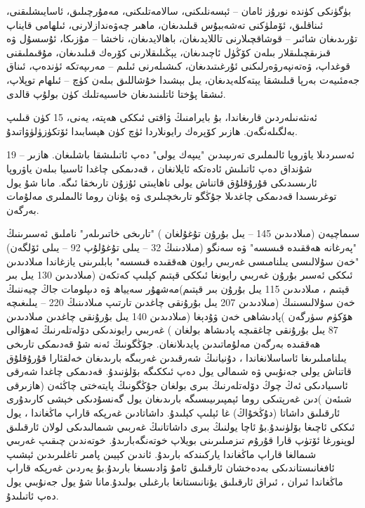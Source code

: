 \documentclass[a4paper]{article}
\begin{document}
\begin{flushright}
بۈگۈنكى كۈندە نورۇز ئامان – ئېسەنلىكنى، سالامەتلىكنى، مەمۇرچىلىق، ئاسايىشلىقنى، ئىناقلىق، ئۆملۈكنى تەشەببۇس قىلىدىغان، ماھىر چەۋەندازلارنى، ئىلھامى قايناپ تۇرىدىغان شائىر – قوشاقچىلارنى تاللايدىغان، باھالايدىغان، ناخشا – مۇزىكا، ئۇسسۇل ۋە قىزىقچىلىقلار بىلەن كۆڭۈل ئاچىدىغان، يېڭىلىقلارنى كۆرەك قىلىدىغان، مۇقىملىقنى قوغداپ، ۋەتەنپەرۋەرلىكنى ئۇرغىتىدىغان، كىشىلەرنى ئىلىم – مەرىپەتكە ئۈندەپ، ئىناق جەمئىيەت بەرپا قىلىشقا يېتەكلەيدىغان، يىل بېشىدا خۇشاللىق بىلەن كۈچ – ئىلھام توپلاپ، ئىشقا پۇختا ئاتلىنىدىغان خاسىيەتلىك كۈن بولۇپ قالدى.



ئەنئەنىلەردىن قارىغاندا، بۇ بايرامنىڭ ۋاقتى ئىككى ھەپتە، يەنى، 15 كۈن قىلىپ بەلگىلەنگەن. ھازىر كۆپرەك رايونلاردا ئۈچ كۈن ھېسابىدا ئۆتكۈزۈلۈۋاتىدۇ.

19 – ئەسىردىلا ياۋروپا ئالىملىرى تەرىپىدىن "يىپەك يولى" دەپ ئاتىلىشقا باشلىغان. ھازىر شۇنداق دەپ ئاتىلىش ئادەتكە ئايلانغان ، قەدىمكى چاغدا ئاسىيا بىلەن ياۋروپا ئارىسىدىكى قۇرۇقلۇق قاتناش يولى ناھايىتى ئۇزۇن تارىخقا ئىگە. مانا شۇ يول توغرىسىدا قەدىمكى چاغدىلا جۇڭگو تارىخچىلىرى ۋە يۇنان روما ئالىملىرى مەلۇمات بەرگەن.



سىماچيەن (مىلادىدىن 145 – يىل بۇرۇن تۇغۇلغان ) "تارىخى خاتىرىلەر" ناملىق ئەسىرىنىڭ "پەرغانە ھەققىدە قىسسە" ۋە سەنگو (مىلادىنىڭ 32 – يىلى تۇغۇلۇپ 92 – يىلى ئۆلگەن) "خەن سۇلالىسى يىلنامىسى غەربىي رايون ھەققىدە قىسسە" بابلىرىنى يازغاندا مىلادىدىن ئىككى ئەسىر بۇرۇن غەربىي رايونغا ئىككى قېتىم كېلىپ كەتكەن (مىلادىدىن 130 يىل بىر قېتىم ، مىلادىدىن 115 يىل بۇرۇن بىر قېتىم)مەشھۇر سەيياھ ۋە دىپلومات جاڭ چيەننىڭ خەن سۇلالىسىنىڭ (مىلادىدىن 207 يىل بۇرۇنقى چاغدىن تارتىپ مىلادىنىڭ 220 – يىلىغىچە ھۆكۈم سۈرگەن )پادىشاھى خەن ۋۇدېغا (مىلادىدىن 140 يىل بۇرۇنقى چاغدىن مىلادىدىن 87 يىل بۇرۇنقى چاغقىچە پادىشاھ بولغان ) غەربىي رايوندىكى دۆلەتلەرنىڭ ئەھۋالى ھەققىدە بەرگەن مەلۇماتىدىن پايدىلانغان. جۇڭگونىڭ ئەنە شۇ قەدىمكى تارىخى يىلنامىلىرىغا ئاساسلانغاندا ، دۇنيانىڭ شەرقىدىن غەربىگە بارىدىغان خەلقئارا قۇرۇقلۇق قاتناش يولى جەنۇبىي ۋە شىمالى يول دەپ ئىككىگە بۆلۈنىدۇ. قەدىمكى چاغدا شەرقى ئاسىيادىكى ئەڭ چوڭ دۆلەتلەرنىڭ بىرى بولغان جۇڭگونىڭ پايتەختى چاڭئەن (ھازىرقى شىئەن )دىن غەرپتىكى روما ئېمپىرىيىسىگە بارىدىغان يول گەنسۇدىكى خېشى كارىدۇرى ئارقىلىق داشاتا (دۇڭخۇاڭ) غا ئېلىپ كېلىدۇ. داشاتادىن غەرپكە قاراپ ماڭغاندا ، يول ئىككى ئاچىغا بۆلۈنىدۇ.بۇ ئاچا يولنىڭ بىرى داشاتانىڭ غەربىي شىمالىدىكى لولان ئارقىلىق لوپنورغا ئۆتۈپ قارا قۇرۇم تىزمىلىرىنى بويلاپ خوتەنگەبارىدۇ. خوتەندىن چىقىپ غەربىي شىمالغا قاراپ ماڭغاندا ياركىندكە بارىدۇ. ئاندىن كېيىن پامىر تاغلىرىدىن ئېشىپ ئافغانىستاندىكى بەدەخشان ئارقىلىق ئامۇ ۋادىسىغا بارىدۇ.بۇ يەردىن غەرپكە قاراپ ماڭغاندا ئىران ، ئىراق ئارقىلىق يۇنانىستانغا بارغىلى بولىدۇ.مانا شۇ يول جەنۇبىي يول دەپ ئاتىلىدۇ.




\end{flushright}
\end{document}
